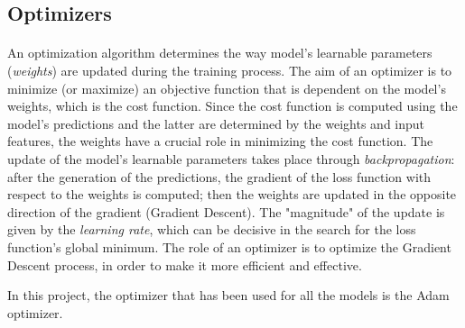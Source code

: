 \subsection{Optimizers}
\paragraph{} An optimization algorithm determines the way model's learnable parameters (\textit{weights}) are updated during the training process. The aim of an optimizer is to minimize (or maximize) an objective function that is dependent on the model's weights, which is the cost function. Since the cost function is computed using the model's predictions and the latter are determined by the weights and input features, the weights have a crucial role in minimizing the cost function. The update of the model's learnable parameters takes place through \textit{backpropagation}: after the generation of the predictions, the gradient of the loss function with respect to the weights is computed; then the weights are updated in the opposite direction of the gradient (Gradient Descent). The "magnitude" of the update is given by the \textit{learning rate}, which can be decisive in the search for the loss function's global minimum. The role of an optimizer is to optimize the Gradient Descent process, in order to make it more efficient and effective.

In this project, the optimizer that has been used for all the models is the Adam optimizer.

